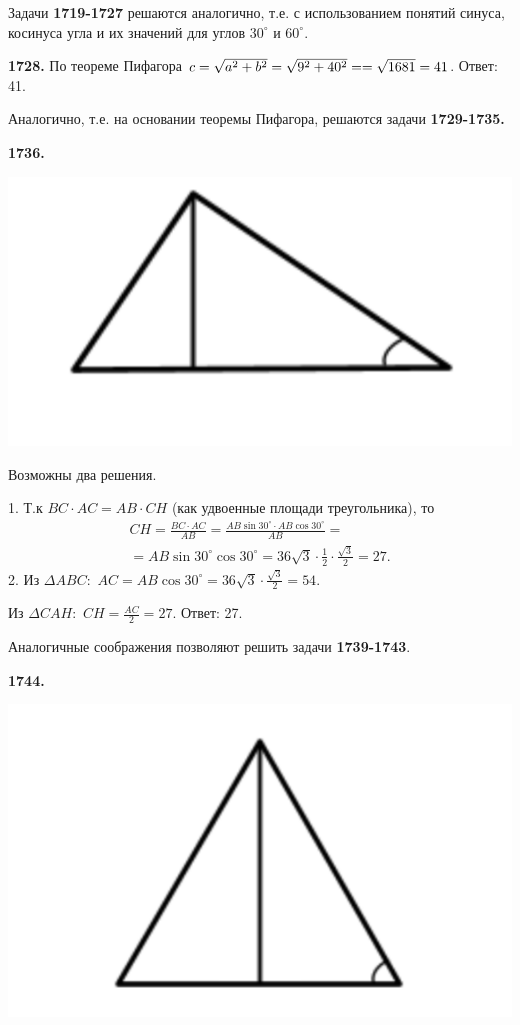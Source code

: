 Задачи \textbf{1719-1727} решаются аналогично, т.е. с использованием понятий синуса, косинуса угла и их значений для углов $30^\circ$ и $60^\circ$.

\textbf{1728.} По теореме Пифагора $c = \sqrt{a^2 + b^2} = \sqrt{9^2 + 40^2} = \linebreak = \sqrt{1681} = 41$. \newline \null \hspace*{\fill} Ответ: 41.

Аналогично, т.е. на основании теоремы Пифагора,  решаются задачи \textbf{1729-1735.}

\textbf{1736.}


{\centering \includegraphics[width=0.4\linewidth]{Geometry/Content/2.png}
	
}

Возможны два решения.

1. Т.к $BC \cdot AC = AB \cdot CH$ (как удвоенные площади треугольника), то 
\begin{eqnarray*}
CH = \frac{BC \cdot AC}{AB} = \frac{AB \sin{30^\circ}\cdot AB \cos{30^\circ}}{AB} = \\=AB \sin{30^\circ}\cos{30^\circ} = 36\sqrt{3}\cdot\frac{1}{2}\cdot\frac{\sqrt{3}}{2} = 27.
\end{eqnarray*}
2. Из $\Delta ABC:$ $AC = AB\cos{30^\circ} = 36\sqrt{3}\cdot \frac{\sqrt{3}}{2} = 54.$

Из $\Delta CAH:$ $CH = \frac{AC}{2} = 27.$ \newline \null \hspace*{\fill} Ответ: 27.

\clearpage 

Аналогичные соображения позволяют решить задачи  \textbf{1739-1743}.

\textbf{1744.}

{\centering \includegraphics[width=0.4\linewidth]{Geometry/Content/3.png}
	
}

